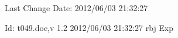 Last Change $ $Date: 2012/06/03 21:32:27 $ $

$ $Id: t049.doc,v 1.2 2012/06/03 21:32:27 rbj Exp $ $
